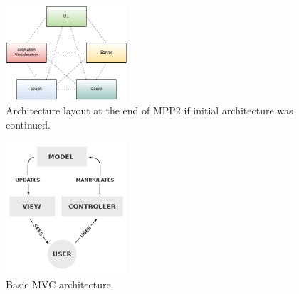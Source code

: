 \begin{figure}[h!]
    \centering
    \includegraphics[width=0.4\textwidth]{images/initial_architecture_future.png}
    \caption{Architecture layout at the end of MPP2 if initial architecture was continued.}
    \label{fig:initial_architecture_future}
\end{figure}

\begin{figure}[h!]
    \centering
    \includegraphics[width=0.4\textwidth]{images/mvc.png}
    \caption{Basic \ac{MVC} architecture}
    \label{fig:mvc}
\end{figure}


